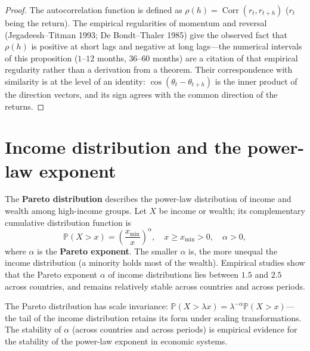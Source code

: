 \begin{proof}
The autocorrelation function is defined as $\rho(h) = \operatorname{Corr}(r_t, r_{t+h})$ ($r_t$ being the return). The empirical regularities of momentum and reversal (Jegadeesh--Titman 1993; De Bondt--Thaler 1985) give the observed fact that $\rho(h)$ is positive at short lags and negative at long lags---the numerical intervals of this proposition ($1$--$12$ months, $36$--$60$ months) are a citation of that empirical regularity rather than a derivation from a theorem. Their correspondence with similarity is at the level of an identity: $\cos(\theta_t - \theta_{t+h})$ is the inner product of the direction vectors, and its sign agrees with the common direction of the returns.
\end{proof}

\section{Income distribution and the power-law exponent}

\begin{definition}\label{def:pareto_distribution}
The \textbf{Pareto distribution} describes the power-law distribution of income and wealth among high-income groups. Let $X$ be income or wealth; its complementary cumulative distribution function is
\[
\mathbb{P}(X > x) = \left(\frac{x_{\min}}{x}\right)^\alpha, \quad x \ge x_{\min} > 0, \quad \alpha > 0,
\]
where $\alpha$ is the \textbf{Pareto exponent}. The smaller $\alpha$ is, the more unequal the income distribution (a minority holds most of the wealth). Empirical studies show that the Pareto exponent $\alpha$ of income distributions lies between $1.5$ and $2.5$ across countries, and remains relatively stable across countries and across periods.

The Pareto distribution has scale invariance: $\mathbb{P}(X > \lambda x) = \lambda^{-\alpha} \mathbb{P}(X > x)$---the tail of the income distribution retains its form under scaling transformations. The stability of $\alpha$ (across countries and across periods) is empirical evidence for the stability of the power-law exponent in economic systems.
\end{definition}

